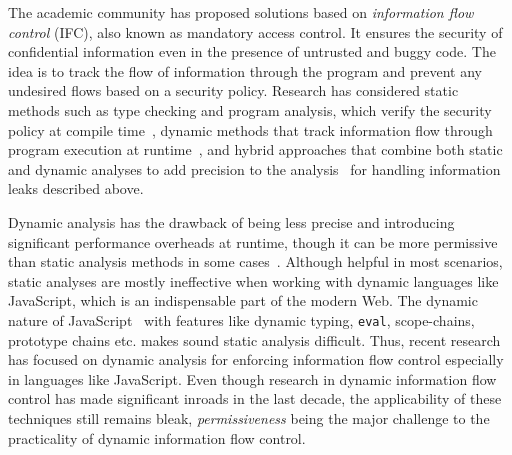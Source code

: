 The academic community has proposed solutions based on
\emph{information flow control} (IFC), also known as mandatory access
control. It ensures the security of
confidential information even in the presence of untrusted and buggy
code. The idea is to track the flow of information through the program
and prevent any undesired flows based on a security policy. 
Research has considered static methods such as type checking and
program analysis, which verify the security policy at compile
time~\cite{denning76, denning77, myersJFlow, volpano, pottier2003,
  hunt2006:types, LBIFS, hammer09ijis}, 
dynamic methods that track information flow through program execution
at runtime~\cite{fenton, plas09, plas10, Askarov09, Sabelfeld10, SME,
  csf12, austin12POPL, jeeves, plas14, cowl},    
and hybrid approaches that combine both static and dynamic analyses to add
precision to the analysis~\cite{Nentwich07, Gurvan06, Gurvan07,
  russo10CSF, vogt07NDSS, post14, csf15Hedin} 
for handling information leaks described above. 

Dynamic analysis has the drawback of being less precise and
introducing significant performance overheads at runtime, though it
can be more permissive than static analysis methods in some
cases~\cite{russo10CSF}. Although helpful in most 
scenarios, static analyses are mostly ineffective when working with
dynamic languages like JavaScript, which is an indispensable part of
the modern Web. The dynamic nature of
JavaScript~\cite{richards11ECOOP, oopsla13} with features like dynamic
typing, \texttt{eval},  scope-chains, prototype chains etc. makes sound
static analysis difficult. Thus, recent research has focused on
dynamic analysis for enforcing information flow control especially in
languages like JavaScript. Even though research in dynamic information
flow control has made significant inroads in the last decade, the
applicability of these techniques still remains bleak, 
\emph{permissiveness} being the major challenge to
the practicality of dynamic information flow control. 

